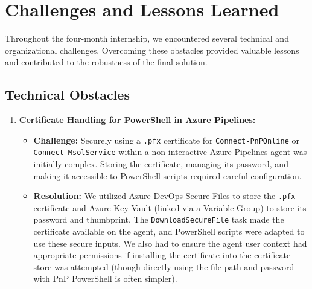 \chapter{Challenges and Lessons Learned}
\label{chapter:ChallengesLessonsLearned}

Throughout the four-month internship, we encountered several technical and organizational challenges. Overcoming these obstacles provided valuable lessons and contributed to the robustness of the final solution.

\section{Technical Obstacles}
\label{sec:TechnicalObstacles}

\begin{enumerate}
    \item \textbf{Certificate Handling for PowerShell in Azure Pipelines:}
    \begin{itemize}
        \item \textbf{Challenge:} Securely using a \texttt{.pfx} certificate for \texttt{Connect-PnPOnline} or \texttt{Connect-MsolService} within a non-interactive Azure Pipelines agent was initially complex. Storing the certificate, managing its password, and making it accessible to PowerShell scripts required careful configuration.
        \item \textbf{Resolution:} We utilized Azure DevOps Secure Files to store the \texttt{.pfx} certificate and Azure Key Vault (linked via a Variable Group) to store its password and thumbprint. The \texttt{DownloadSecureFile} task made the certificate available on the agent, and PowerShell scripts were adapted to use these secure inputs. We also had to ensure the agent user context had appropriate permissions if installing the certificate into the certificate store was attempted (though directly using the file path and password with PnP PowerShell is often simpler).
    \end{itemize}


\end{enumerate}
